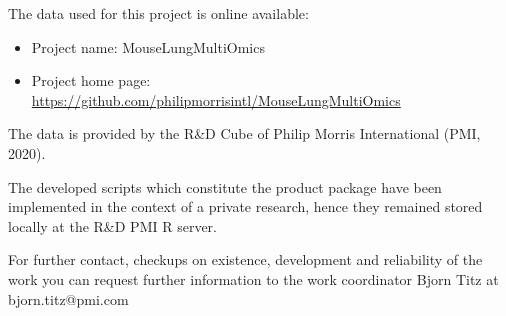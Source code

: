 The data used for this project is online available:
\begin{itemize}
    \item Project name: MouseLungMultiOmics
    \item Project home page: \url{https://github.com/philipmorrisintl/MouseLungMultiOmics}
\end{itemize}

The data is provided by the R\&D Cube of Philip Morris International (PMI, 2020).

The developed scripts which constitute the product package have been  implemented in the context of a private research, hence they remained stored locally at the R&D PMI R server.

For further contact, checkups on existence, development and reliability of the work you can request further information to the work coordinator Bjorn Titz at bjorn.titz@pmi.com